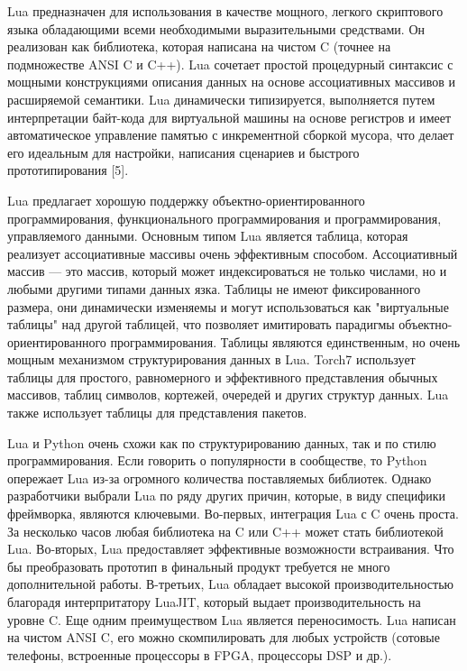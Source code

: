 \documentclass[a4paper,english,russian]{G2-105}
\begin{document}
\par Lua предназначен для использования в качестве мощного, легкого скриптового языка обладающими всеми необходимыми выразительными средствами. Он реализован как библиотека, которая написана на чистом C (точнее на подмножестве ANSI C и C++). Lua сочетает простой процедурный синтаксис с мощными конструкциями описания данных на основе ассоциативных массивов и расширяемой семантики. Lua динамически типизируется, выполняется путем интерпретации байт-кода для виртуальной машины на основе регистров и имеет автоматическое управление памятью с инкрементной сборкой мусора, что делает его идеальным для настройки, написания сценариев и быстрого прототипирования [5].
\par Lua предлагает хорошую поддержку объектно-ориентированного программирования, функционального программирования и программирования, управляемого данными. Основным типом Lua является таблица, которая реализует ассоциативные массивы очень эффективным способом. Ассоциативный массив --- это массив, который может индексироваться не только числами, но и любыми другими типами данных язка. Таблицы не имеют фиксированного размера, они динамически изменяемы и могут использоваться как "виртуальные таблицы" над другой таблицей, что позволяет имитировать парадигмы объектно-ориентированного программирования. Таблицы являются единственным, но очень мощным механизмом структурирования данных в Lua. Torch7 использует таблицы для простого, равномерного и эффективного представления обычных массивов, таблиц символов, кортежей, очередей и других структур данных. Lua также использует таблицы для представления пакетов.
\par Lua и Python очень схожи как по структурированию данных, так и по стилю программирования. Если говорить о популярности в сообществе, то Python опережает Lua из-за огромного количества поставляемых библиотек. Однако разработчики выбрали Lua по ряду других причин, которые, в виду специфики фреймворка, являются ключевыми. Во-первых, интеграция Lua с C очень проста. За несколько часов любая библиотека на C или C++ может стать библиотекой Lua. Во-вторых, Lua предоставляет эффективные возможности встраивания. Что бы преобразовать прототип в финальный продукт требуется не много дополнительной работы. В-третьих, Lua обладает высокой производительностью благорадя интерпритатору LuaJIT, который выдает производительность на уровне C. Еще одним преимуществом Lua является переносимость. Lua написан на чистом ANSI C, его можно скомпилировать для любых устройств (сотовые телефоны, встроенные процессоры в FPGA, процессоры DSP и др.).
\end{document}
